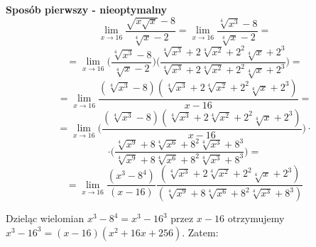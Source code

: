 \documentclass{article}
\begin{document}
\textbf{Sposób pierwszy - nieoptymalny}
\begin{equation*}
    \lim_{x \to 16} \frac{\sqrt{x \sqrt{x}} - 8}{\sqrt[4]{x} - 2} = \lim_{x \to 16} \frac{\sqrt[4]{x^3} - 8}{\sqrt[4]{x} - 2} =
\end{equation*}
\begin{equation*}
    = \lim_{x \to 16} \Bigg(\frac{\sqrt[4]{x^3} - 8}{\sqrt[4]{x} - 2}\Bigg) \Bigg(\frac{\sqrt[4]{x^3} + 2\sqrt[4]{x^2} + 2^{2}\sqrt[4]{x} + 2^3}{\sqrt[4]{x^3} + 2\sqrt[4]{x^2} + 2^{2}\sqrt[4]{x} + 2^3}\Bigg) = 
\end{equation*}
\begin{equation*}
    = \lim_{x \to 16} \frac{(\sqrt[4]{x^3} - 8)(\sqrt[4]{x^3} + 2\sqrt[4]{x^2} + 2^{2}\sqrt[4]{x} + 2^3)}{x - 16} = 
\end{equation*}
\begin{equation*}
    = \lim_{x \to 16} \Bigg(\frac{(\sqrt[4]{x^3} - 8)(\sqrt[4]{x^3} + 2\sqrt[4]{x^2} + 2^{2}\sqrt[4]{x} + 2^3)}{x - 16}\Bigg) \cdot 
\end{equation*}
\begin{equation*}
    \cdot \Bigg(\frac{\sqrt[4]{x^9} + 8\sqrt[4]{x^6} + 8^{2}\sqrt[4]{x^3} + 8^3}{\sqrt[4]{x^9} + 8\sqrt[4]{x^6} + 8^{2}\sqrt[4]{x^3} + 8^3}\Bigg) =
\end{equation*}
\begin{equation*}
    = \lim_{x \to 16} \frac{(x^3 - 8^4)}{(x - 16)}\frac{(\sqrt[4]{x^3} + 2\sqrt[4]{x^2} + 2^{2}\sqrt[4]{x} + 2^3)}{(\sqrt[4]{x^9} + 8\sqrt[4]{x^6} + 8^{2}\sqrt[4]{x^3} + 8^3)}
\end{equation*}

Dzieląc wielomian \(x^3 - 8^4 = x^3 - 16^3\) przez \(x-16\) otrzymujemy \(x^3 - 16^3 = (x-16)(x^2 + 16x + 256)\). Zatem:
\end{document}
